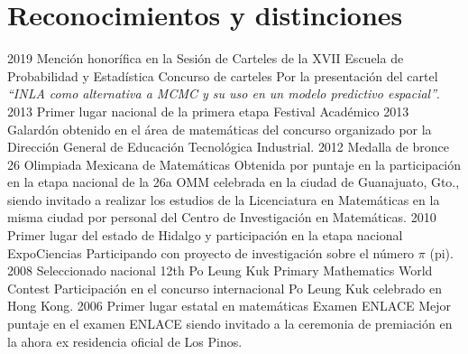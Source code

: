 \documentclass[]{friggeri-cv}
\begin{document}
\section{Reconocimientos y distinciones}
\vspace{-0.4cm}
\begin{entrylist}
  \entry
    {\hspace{0.9cm}2019}
    {Mención honorífica en la Sesión de Carteles de la XVII Escuela de\\Probabilidad y Estadística}
    {Concurso de carteles}
    {Por la presentación del cartel \emph{“INLA como alternativa a MCMC y su uso en un modelo predictivo espacial”}.}
    \entry
    {\hspace{0.9cm}2013}
    {Primer lugar nacional de la primera etapa}
    {Festival Académico 2013}
    {Galardón obtenido en el área de matemáticas del concurso organizado por la Dirección General de Educación Tecnológica Industrial.}
    \entry
    {\hspace{0.9cm}2012}
    {Medalla de bronce}
    {26 Olimpiada Mexicana de Matemáticas}
    {Obtenida por puntaje en la participación en la etapa nacional de la 26a OMM celebrada en la ciudad de Guanajuato, Gto., siendo invitado a realizar los estudios de la Licenciatura en Matemáticas en la misma ciudad por personal del Centro de Investigación  en Matemáticas.}
    \entry
    {\hspace{0.9cm}2010}
    {Primer lugar del estado de Hidalgo y participación en la etapa nacional}
    {ExpoCiencias}
    {Participando con proyecto de investigación sobre el número $\pi$ (pi).}
    \entry
    {\hspace{0.9cm}2008}
    {Seleccionado nacional}
    {12th Po Leung Kuk Primary Mathematics World Contest}
    {Participación en el concurso internacional Po Leung Kuk celebrado en Hong Kong.}
    \entry
    {\hspace{0.9cm}2006}
    {Primer lugar estatal en matemáticas}
    {Examen ENLACE}
    {Mejor puntaje en el examen ENLACE siendo invitado a la ceremonia de premiación en la ahora ex residencia oficial de Los Pinos.}
\end{entrylist}

\end{document}
